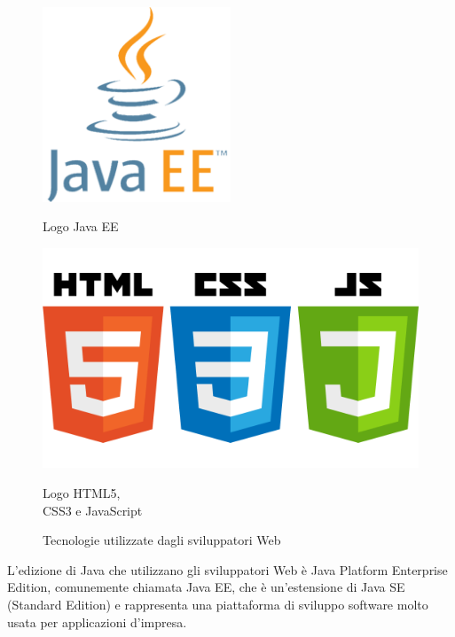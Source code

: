 \begin{figure}[htbp]
\centering
\begin{minipage}[c]{.40\textwidth}
\centering\setlength{\captionmargin}{0pt}%
\includegraphics[width=0.5\textwidth]{immagini/JavaEE}
\caption{Logo Java EE}
\end{minipage}%
\begin{minipage}[c]{.40\textwidth}
\centering\setlength{\captionmargin}{0pt}%
\includegraphics[width=1\textwidth]{immagini/HTML5_CSS_JavaScript}
\caption{Logo HTML5,\\CSS3 e JavaScript}
\end{minipage}
\caption{Tecnologie utilizzate dagli sviluppatori Web}
\end{figure}
		
	L'edizione di Java che utilizzano gli sviluppatori Web è Java Platform Enterprise Edition, comunemente chiamata Java EE, che è un'estensione di Java SE (Standard Edition) e rappresenta una piattaforma di sviluppo software molto usata per applicazioni d'impresa.\\
	
